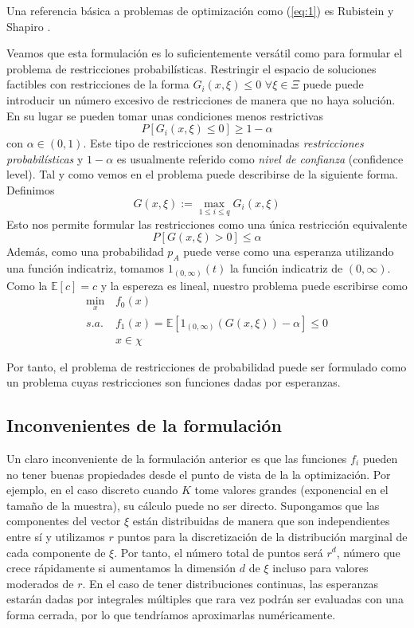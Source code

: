 \documentclass[twoside,a4paper,openright,12pt]{book}
\newcommand{\E}{\mathbb{E}}
\begin{document}
Una referencia básica a problemas de optimización como (\ref{eq:1}) es Rubistein y Shapiro \cite{shapiro}. 

Veamos que esta formulación es lo suficientemente versátil como para formular el problema de restricciones probabilísticas. Restringir el espacio de soluciones factibles con restricciones de la forma $G_i(x,\xi)\leq 0$ $\forall \xi\in\Xi$ puede puede introducir un número excesivo de restricciones de manera que no haya solución. En su lugar se pueden tomar unas condiciones menos restrictivas
$$
P[G_i(x,\xi)\leq 0]\geq 1-\alpha
$$
con $\alpha\in (0,1)$. Este tipo de restricciones son denominadas \textit{restricciones probabilísticas} y $1-\alpha$ es usualmente referido como \textit{nivel de confianza} (confidence level). Tal y como vemos en \cite{chance} el problema puede describirse de la siguiente forma. Definimos $$G(x,\xi):=\max_{1\leq i\leq q}G_i(x,\xi)$$
Esto nos permite formular las restricciones como una única restricción equivalente
$$
P[G(x,\xi)> 0]\leq \alpha
$$
Además, como una probabilidad $p_A$ puede verse como una esperanza utilizando una función indicatriz, tomamos $1_{(0,\infty)}(t)$ la función indicatriz de $(0,\infty)$. Como la $\E[c]=c$ y la espereza es lineal, nuestro problema puede escribirse como
\begin{align*}
\min_{x} &f_0(x)\\
s.a.\;  & f_1(x)= \E[1_{(0,\infty)}(G(x,\xi))-\alpha]\leq 0 \tag{2} \label{eq:2}\\
&x\in\chi
\end{align*}

Por tanto, el problema de restricciones de probabilidad puede ser formulado como un problema cuyas restricciones son funciones dadas por esperanzas.


\subsection*{Inconvenientes de la formulación}
Un claro inconveniente de la formulación anterior es que las funciones $f_i$ pueden no tener buenas propiedades desde el punto de vista de la la optimización. Por ejemplo, en el caso discreto cuando $K$ tome valores grandes (exponencial en el tamaño de la muestra), su cálculo puede no ser directo. Supongamos que las componentes del vector $\xi$ están distribuidas de manera que son independientes entre sí y utilizamos $r$ puntos para la discretización de la distribución marginal de cada componente de $\xi$. Por tanto, el número total de puntos será $r^d$, número que crece rápidamente si aumentamos la dimensión $d$ de $\xi$ incluso para valores moderados de $r$. En el caso de tener distribuciones continuas, las esperanzas estarán dadas por integrales múltiples que rara vez podrán ser evaluadas con una forma cerrada, por lo que tendríamos aproximarlas numéricamente.
\end{document}
